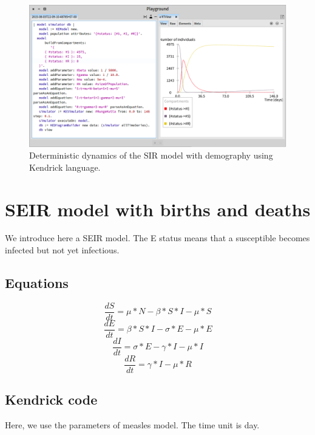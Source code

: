 \documentclass[a4paper,10pt,twoside]{book}
\begin{document}
\begin{figure}

\begin{center}
\includegraphics[width=1.0\textwidth]{figures/SIR_Dem_RK4.png}\caption{Deterministic dynamics of the SIR model with demography using Kendrick language.\label{SIR_Dem_RK4}}\end{center}
\end{figure}

\section{ SEIR model with births and deaths}
We introduce here a SEIR model. The E status means that a susceptible becomes infected but not yet infectious.
\subsection{Equations}

  \begin{equation}
    \frac{dS}{dt} = \mu*N - \beta*S*I - \mu*S
  \end{equation}
  \begin{equation}
    \frac{dE}{dt} = \beta*S*I - \sigma*E - \mu*E
  \end{equation}
  \begin{equation}
    \frac{dI}{dt} = \sigma*E - \gamma*I - \mu*I
  \end{equation}
  \begin{equation}
    \frac{dR}{dt} = \gamma*I - \mu*R
  \end{equation}
  
\subsection{Kendrick code}
Here, we use the parameters of measles model. The time unit is day.
\end{document}
